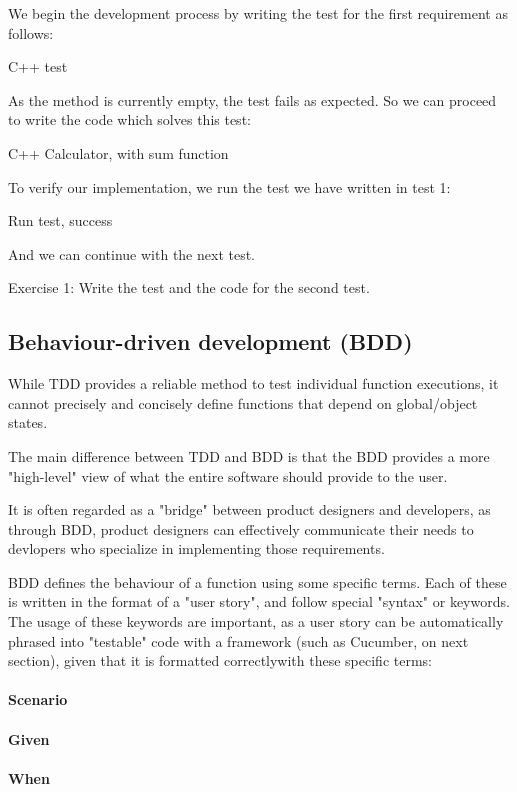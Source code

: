 We begin the development process by writing the test for the first requirement as follows:

\rem C++ test

As the  method is currently empty, the test fails as expected. So we can proceed to write the code which solves this test:

\rem C++ Calculator, with sum function

To verify our implementation, we run the test we have written in test 1:

\rem Run test, success

And we can continue with the next test. 

\rem Exercise 1: Write the test and the code for the second test.

\subsection{Behaviour-driven development (BDD)}

While TDD provides a reliable method to test individual function executions, it cannot precisely and concisely define functions that depend on global/object states.

The main difference between TDD and BDD is that the BDD provides a more "high-level" view of what the entire software should provide to the user.

It is often regarded as a "bridge" between product designers and developers, as through BDD, product designers can effectively communicate their needs to devlopers who specialize in implementing those requirements. 

BDD defines the behaviour of a function using some specific terms. Each of these is written in the format of a "user story", and follow special "syntax" or keywords. The usage of these keywords are important, as a user story can be automatically phrased into "testable" code with a framework (such as Cucumber, on next section), given that it is formatted correctlywith these specific terms:

\paragraph{Scenario}

\paragraph{Given}

\paragraph{When}

